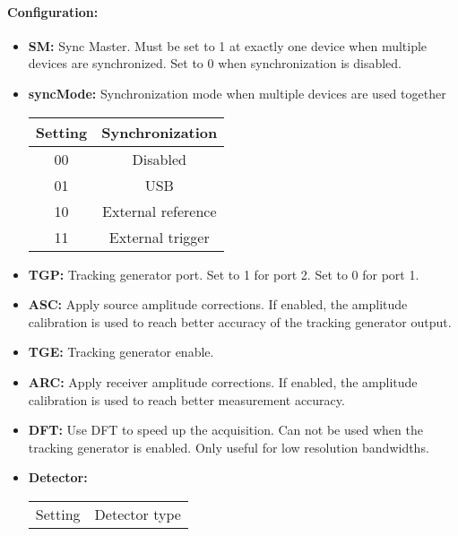 \documentclass[a4paper,11pt]{article}
\newcommand{\bitrect}[2]{
  \begin{pgfonlayer}{foreground}
    \draw [thick] (0,0) rectangle (#1,1);
    \pgfmathsetmacro\result{#1-1}
    \foreach \x in {1,...,\result}
      \draw [thick] (\x,1) -- (\x, 0.8);
  \end{pgfonlayer}
  \bitlabels{#1}{#2}
}
\newcommand{\rwbits}[3]{
  \draw [thick] (#1,0) rectangle ++(#2,1) node[pos=0.5]{#3};
  \pgfmathsetmacro\start{#1+0.5}
  \pgfmathsetmacro\finish{#1+#2-0.5}
}
\newcommand{\robits}[3]{
  \begin{pgfonlayer}{background}
    \draw [thick, fill=lightgray] (#1,0) rectangle ++(#2,1) node[pos=0.5]{#3};
  \end{pgfonlayer}
  \pgfmathsetmacro\start{#1+0.5}
  \pgfmathsetmacro\finish{#1+#2-0.5}
}
\newcommand{\bitlabels}[2]{
  \foreach \bit in {1,...,#1}{
     \pgfmathsetmacro\result{#2}
     \node [above] at (\bit-0.5, 1) {\pgfmathprintnumber{\result}};
   }
}
\begin{document}
\paragraph{Configuration:}
\begin{center}
\end{center}
\begin{itemize}
\item \textbf{SM:} Sync Master. Must be set to 1 at exactly one device when multiple devices are synchronized. Set to 0 when synchronization is disabled.
\item \textbf{syncMode:} Synchronization mode when multiple devices are used together
\begin{center}
\begin{tabular}{ c|c }
Setting & Synchronization\\
 \hline
00 & Disabled \\
01 & USB\\
10 & External reference\\
11 & External trigger\\
\end{tabular}
\end{center}
\item \textbf{TGP:} Tracking generator port. Set to 1 for port 2. Set to 0 for port 1.
\item \textbf{ASC:} Apply source amplitude corrections. If enabled, the amplitude calibration is used to reach better accuracy of the tracking generator output.
\item \textbf{TGE:} Tracking generator enable.
\item \textbf{ARC:} Apply receiver amplitude corrections. If enabled, the amplitude calibration is used to reach better measurement accuracy.
\item \textbf{DFT:} Use DFT to speed up the acquisition. Can not be used when the tracking generator is enabled. Only useful for low resolution bandwidths.
\item \textbf{Detector:}
\begin{center}
\begin{tabular}{ c|c }
Setting & Detector type\\

\end{tabular}
\end{center}
\end{itemize}
\end{document}
